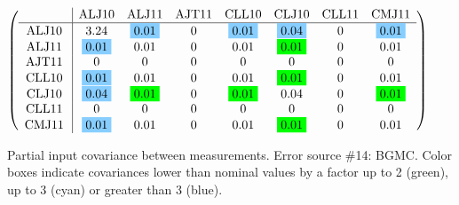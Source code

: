 \begin{table}[H]
\scriptsize
\begin{center}
\renewcommand{\arraystretch}{1.1}
\begin{math}\left(\begin{array}{c|ccccccc}
 & \mathrm{ALJ10} & 
\mathrm{ALJ11} & 
\mathrm{AJT11} & 
\mathrm{CLL10} & 
\mathrm{CLJ10} & 
\mathrm{CLL11} & 
\mathrm{CMJ11} \\
\hline
\mathrm{ALJ10} \hspace*{2pt} &       3.24 &  \colorbox{SkyBlue1}{$      0.01$} &  0 &  \colorbox{SkyBlue1}{$      0.01$} &  \colorbox{SkyBlue1}{$      0.04$} &  0 &  \colorbox{SkyBlue1}{$      0.01$} \\
\mathrm{ALJ11} \hspace*{2pt} &  \colorbox{SkyBlue1}{$      0.01$} &       0.01 &  0 &       0.01 &  \colorbox{Green1}{$      0.01$} &  0 &       0.01 \\
\mathrm{AJT11} \hspace*{2pt} &  0 &  0 &  0 &  0 &  0 &  0 &  0 \\
\mathrm{CLL10} \hspace*{2pt} &  \colorbox{SkyBlue1}{$      0.01$} &       0.01 &  0 &       0.01 &  \colorbox{Green1}{$      0.01$} &  0 &       0.01 \\
\mathrm{CLJ10} \hspace*{2pt} &  \colorbox{SkyBlue1}{$      0.04$} &  \colorbox{Green1}{$      0.01$} &  0 &  \colorbox{Green1}{$      0.01$} &       0.04 &  0 &  \colorbox{Green1}{$      0.01$} \\
\mathrm{CLL11} \hspace*{2pt} &  0 &  0 &  0 &  0 &  0 &  0 &  0 \\
\mathrm{CMJ11} \hspace*{2pt} &  \colorbox{SkyBlue1}{$      0.01$} &       0.01 &  0 &       0.01 &  \colorbox{Green1}{$      0.01$} &  0 &       0.01 \\
\end{array}\right)\end{math}
\caption{Partial input covariance between measurements. Error source \#14: BGMC. Color boxes indicate covariances lower than nominal values by a factor up to 2 (green), up to 3 (cyan) or greater than 3 (blue).}
\renewcommand{\arraystretch}{1}
\end{center}
\end{table}
